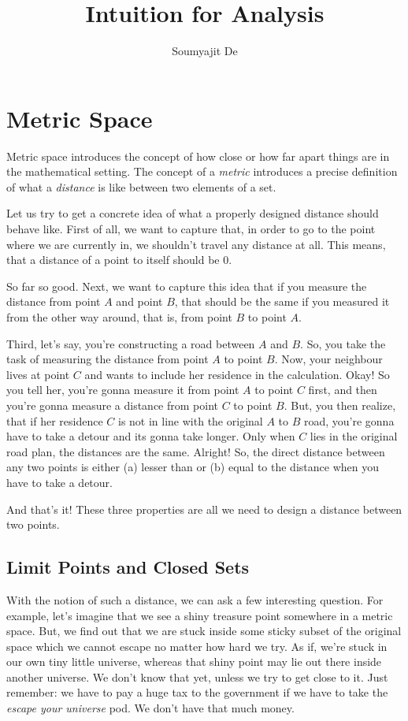 \documentclass{article}
\begin{document}
\title{Intuition for Analysis}
\author{Soumyajit De}
\maketitle

\section{Metric Space}
Metric space introduces the concept of how close or how far apart things are in the mathematical setting. The concept of a \emph{metric} introduces a precise definition of what a \emph{distance} is like between two elements of a set.

Let us try to get a concrete idea of what a properly designed distance should behave like. First of all, we want to capture that, in order to go to the point where we are currently in, we shouldn't travel any distance at all. This means, that a distance of a point to itself should be 0.

So far so good. Next, we want to capture this idea that if you measure the distance from point $A$ and point $B$, that should be the same if you measured it from the other way around, that is, from point $B$ to point $A$.

Third, let's say, you're constructing a road between $A$ and $B$. So, you take the task of measuring the distance from point $A$ to point $B$. Now, your neighbour lives at point $C$ and wants to include her residence in the calculation. Okay! So you tell her, you're gonna measure it from point $A$ to point $C$ first, and then you're gonna measure a distance from point $C$ to point $B$. But, you then realize, that if her residence $C$ is not in line with the original $A$ to $B$ road, you're gonna have to take a detour and its gonna take longer. Only when $C$ lies in the original road plan, the distances are the same. Alright! So, the direct distance between any two points is either (a) lesser than or (b) equal to the distance when you have to take a detour.

And that's it! These three properties are all we need to design a distance between two points.
\subsection{Limit Points and Closed Sets}
With the notion of such a distance, we can ask a few interesting question. For example, let's imagine that we see a shiny treasure point somewhere in a metric space. But, we find out that we are stuck inside some sticky subset of the original space which we cannot escape no matter how hard we try. As if, we're stuck in our own tiny little universe, whereas that shiny point may lie out there inside another universe. We don't know that yet, unless we try to get close to it. Just remember: we have to pay a huge tax to the government if we have to take the \emph{escape your universe} pod. We don't have that much money.
\end{document}

